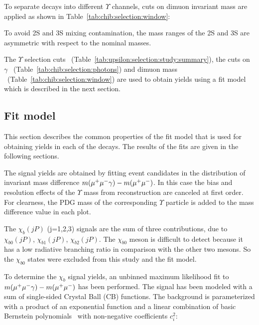 

To separate decays into different $\Upsilon$ channels, cuts on dimuon invariant mass are 
applied as shown in Table~\ref{tab:chib:selection:window}:



To avoid \Y2S and \Y3S mixing contamination, the mass ranges of the \Y2S and \Y3S are
asymmetric with respect to the nominal masses.

The $\Upsilon$ selection cuts
~(Table~\ref{tab:upsilon:selection:study:summary}), the cuts  on $\gamma$
~(Table~\ref{tab:chib:selection:photons}) and dimuon mass  
~(Table~\ref{tab:chib:selection:window}) are used to obtain \chib yields
using a fit model which is described in the next section.


\subsection{Fit model}
\label{sec:chib:fit}

This section describes the common properties of the fit model that is used for
obtaining yields in each of the \chib decays. The results of the fits are
given in the following sections.

The \chib signal yields are obtained by fitting event candidates
in the distribution of invariant mass difference $m(\mu^+\mu^-\gamma) - m(\mu^+\mu^-)$.
In this case the bias and resolution effects of the $\Upsilon$ mass from reconstruction
are canceled at first order. For clearness, the PDG mass of the corresponding $\Upsilon$
particle is added to the mass difference value in each plot.

The $\chi_b(jP)$ (j=1,2,3) signals are the sum of three contributions, due to $\chi_{b0}(jP)$,
$\chi_{b1}(jP)$, $\chi_{b2}(jP)$. The $\chi_{b0}$ meson is difficult to detect
because it has a low radiative branching ratio in comparison with the other two
mesons. So the $\chi_{b0}$ states were excluded from this study and the fit
model.

To determine the $\chi_b$ signal yields, an unbinned maximum likelihood fit to
$m(\mu^+\mu^-\gamma) - m(\mu^+\mu^-)$ has been performed. The signal has been modeled with
a sum of single-sided Crystal Ball (CB)  functions. The background is parameterized with a
product of an exponential function and a linear combination of basic Bernstein
polynomials~\cite{Phillips:2003} with non-negative coefficients $c_{i}^2$:

